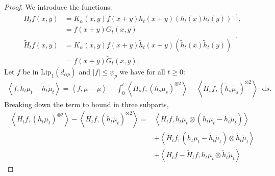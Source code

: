 \documentclass[11pt,a4paper]{article}
\newcommand{\brac}[1]{\left\langle#1\right\rangle}
\newcommand{\dd}{\mathop{}\!\mathrm{d}}
\begin{document}
\begin{proof}
    We introduce the functions:
    \begin{align*}
        H_tf(x,y) &= K_\alpha(x,y) f(x+y) h_t(x+y)\left(h_t(x)h_t(y)\right)^{-1}, \\
        &= f(x+y) G_t(x,y) \\
        \tilde{H}_tf(x,y) &= K_\alpha(x,y) f(x+y) \tilde{h}_t(x+y)\left(\tilde{h}_t(x)\tilde{h}_t(y)\right)^{-1}\\
        &= f(x+y) \tilde{G}_t(x,y).
    \end{align*}
    Let $f$ be in $\text{Lip}_1(d_{\alpha p})$ and $|f| \leq \psi_p$ we have for all $t \geq 0$:
    \begin{align*}
        \brac{f,h_t\mu_t - \tilde{h}_t \tilde{\mu}_t} = \brac{f,\mu - \tilde{\mu}} + \int_0^t \brac{H_sf,\left(h_s\mu_s\right)^{ \otimes 2}} - \brac{\tilde{H}_sf,\left(\tilde{h}_s\tilde{\mu}_s\right)^{\otimes 2}} \dd s.
    \end{align*}
    Breaking down the term to bound in three subparts,
    \begin{subequations}
        \begin{align}
            \brac{H_tf,\left(h_t\mu_t\right)^{\otimes 2}} - \brac{\tilde{H}_tf,\left(\tilde{h}_t\tilde{\mu}_t\right)^{\otimes 2}} =& \brac{H_tf,h_t\mu_t \otimes\left(h_t\mu_t -  \tilde{h}_t \tilde{\mu}_t\right)}\label{proof:eq:h_tmu_t-1} \\
            &+ \brac{\tilde{H}_tf,\left(h_t\mu_t-\tilde{h}_t\tilde{\mu}_t\right) \otimes \tilde{h}_t \tilde{\mu}_t}\label{proof:eq:h_tmu_t-2}\\
            &+ \brac{H_tf - \tilde{H}_tf,h_t\mu_t \otimes \tilde{h}_t \tilde{\mu}_t}\label{proof:eq:h_tmu_t-3}
        \end{align}
        \label{proof:eq:h_tmu_t}
    \end{subequations}


\end{proof}
\end{document}
